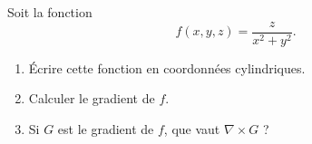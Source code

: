 
\begin{exercice}\label{exoOutilsMath-0081}

    Soit la fonction
    \begin{equation}
        f(x,y,z)=\frac{ z }{ x^2+y^2 }.
    \end{equation}
    \begin{enumerate}
        \item
            Écrire cette fonction en coordonnées cylindriques.
        \item
            Calculer le gradient de $f$.
        \item
            Si $G$ est le gradient de $f$, que vaut $\nabla\times G$ ?
    \end{enumerate}

\end{exercice}
